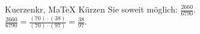 \begin{MAufgabe}{Kuerzen}{kr, MaTeX}
K\"urzen Sie soweit m\"oglich: $\frac{2660}{6790}$.\\ 
\ifLsg\MLoesung
\quad $\frac{2660}{6790}=\frac{(70)\cdot(38)}{(70)\cdot(97)}=\frac{38}{97}$.\else\relax\fi
 \end{MAufgabe}